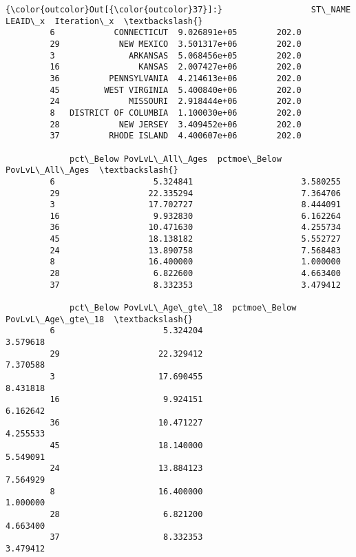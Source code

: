 \documentclass[11pt]{article}
\begin{document}
\begin{Verbatim}[commandchars=\\\{\}]
{\color{outcolor}Out[{\color{outcolor}37}]:}                  ST\_NAME       LEAID\_x  Iteration\_x  \textbackslash{}
         6            CONNECTICUT  9.026891e+05        202.0   
         29            NEW MEXICO  3.501317e+06        202.0   
         3               ARKANSAS  5.068456e+05        202.0   
         16                KANSAS  2.007427e+06        202.0   
         36          PENNSYLVANIA  4.214613e+06        202.0   
         45         WEST VIRGINIA  5.400840e+06        202.0   
         24              MISSOURI  2.918444e+06        202.0   
         8   DISTRICT OF COLUMBIA  1.100030e+06        202.0   
         28            NEW JERSEY  3.409452e+06        202.0   
         37          RHODE ISLAND  4.400607e+06        202.0   
         
             pct\_Below PovLvL\_All\_Ages  pctmoe\_Below PovLvL\_All\_Ages  \textbackslash{}
         6                    5.324841                      3.580255   
         29                  22.335294                      7.364706   
         3                   17.702727                      8.444091   
         16                   9.932830                      6.162264   
         36                  10.471630                      4.255734   
         45                  18.138182                      5.552727   
         24                  13.890758                      7.568483   
         8                   16.400000                      1.000000   
         28                   6.822600                      4.663400   
         37                   8.332353                      3.479412   
         
             pct\_Below PovLvL\_Age\_gte\_18  pctmoe\_Below PovLvL\_Age\_gte\_18  \textbackslash{}
         6                      5.324204                        3.579618   
         29                    22.329412                        7.370588   
         3                     17.690455                        8.431818   
         16                     9.924151                        6.162642   
         36                    10.471227                        4.255533   
         45                    18.140000                        5.549091   
         24                    13.884123                        7.564929   
         8                     16.400000                        1.000000   
         28                     6.821200                        4.663400   
         37                     8.332353                        3.479412   
         

\end{Verbatim}
\end{document}
